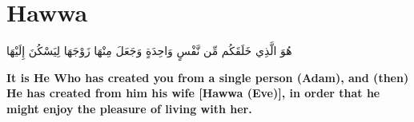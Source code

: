 \chapter{Hawwa}
\begin{center}
    {\Huge    
        \begin{Arabic}
            هُوَ الَّذِي خَلَقَكُم مِّن نَّفْسٍ وَاحِدَةٍ وَجَعَلَ مِنْهَا زَوْجَهَا لِيَسْكُنَ إِلَيْهَا
        \end{Arabic}
    }    
\end{center}
\vspace*{\fill}
\vspace{3cm}
\begin{center}
    \Large \textbf{It is He Who has created you from a single person (Adam), and (then) He has created from him his wife [Hawwa (Eve)], in order that he might enjoy the pleasure of living with her. }
\end{center}

